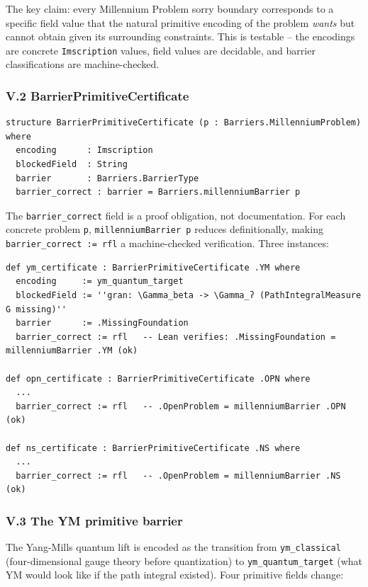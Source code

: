 \documentclass[12pt,a4paper]{article}
\begin{document}
The key claim: every Millennium Problem sorry boundary corresponds to a specific field value that the natural primitive encoding of the problem \emph{wants} but cannot obtain given its surrounding constraints. This is testable  --  the encodings are concrete \texttt{Imscription} values, field values are decidable, and barrier classifications are machine-checked.

\subsubsection{V.2 BarrierPrimitiveCertificate}

\begin{lstlisting}[language=lean]
structure BarrierPrimitiveCertificate (p : Barriers.MillenniumProblem) where
  encoding      : Imscription
  blockedField  : String
  barrier       : Barriers.BarrierType
  barrier_correct : barrier = Barriers.millenniumBarrier p
\end{lstlisting}

The \texttt{barrier\_correct} field is a proof obligation, not documentation. For each concrete problem \texttt{p}, \texttt{millenniumBarrier p} reduces definitionally, making \texttt{barrier\_correct := rfl} a machine-checked verification. Three instances:

\begin{lstlisting}[language=lean]
def ym_certificate : BarrierPrimitiveCertificate .YM where
  encoding     := ym_quantum_target
  blockedField := ''gran: \Gamma_beta -> \Gamma_ʔ (PathIntegralMeasure G missing)''
  barrier      := .MissingFoundation
  barrier_correct := rfl   -- Lean verifies: .MissingFoundation = millenniumBarrier .YM (ok)

def opn_certificate : BarrierPrimitiveCertificate .OPN where
  ...
  barrier_correct := rfl   -- .OpenProblem = millenniumBarrier .OPN (ok)

def ns_certificate : BarrierPrimitiveCertificate .NS where
  ...
  barrier_correct := rfl   -- .OpenProblem = millenniumBarrier .NS (ok)
\end{lstlisting}

\subsubsection{V.3 The YM primitive barrier}

The Yang-Mills quantum lift is encoded as the transition from \texttt{ym\_classical} (four-dimensional gauge theory before quantization) to \texttt{ym\_quantum\_target} (what YM would look like if the path integral existed). Four primitive fields change:
\end{document}
